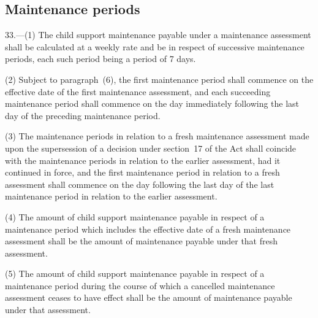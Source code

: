 \documentclass[a4paper,12pt]{article}
\begin{document}
\subsection[33. Maintenance periods]{Maintenance periods}

33.—(1) The child support maintenance payable under a maintenance assessment shall be calculated at a weekly rate and be in respect of successive maintenance periods, each such period being a period of 7 days.

(2) Subject to paragraph~(6), the first maintenance period shall commence on the effective date of the first maintenance assessment, and each succeeding maintenance period shall commence on the day immediately following the last day of the preceding maintenance period.

(3) The maintenance periods in relation to a fresh maintenance assessment 
made upon the supersession of a decision under section~17 of the Act  %
shall coincide with the maintenance periods in relation to the earlier assessment, had it continued in force, and the first maintenance period in relation to a fresh assessment shall commence on the day following the last day of the last maintenance period in relation to the earlier assessment.

(4) The amount of child support maintenance payable in respect of a maintenance period which includes the effective date of a fresh maintenance assessment shall be the amount of maintenance payable under that fresh assessment.

(5) The amount of child support maintenance payable in respect of a maintenance period during the course of which a cancelled maintenance assessment ceases to have effect shall be the amount of maintenance payable under that assessment.

\end{document}
